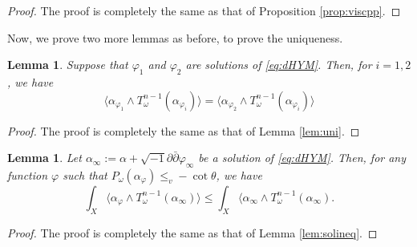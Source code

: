 \documentclass{amsart}
\numberwithin{equation}{section}
\theoremstyle{plain}
\newtheorem{lem}[equation]{Lemma}
\theoremstyle{definition}
\theoremstyle{remark}
\newcommand{\delb}{\sqrt{-1}\partial\bar{\partial}}
\begin{document}
\begin{proof}
    The proof is completely the same as that of Proposition \ref{prop:viscpp}.
\end{proof}

Now, we prove two more lemmas as before, to prove the uniqueness.

\begin{lem}
    Suppose that $\varphi_1$ and $\varphi_2$ are solutions of \eqref{eq:dHYM}. Then, for $i=1,2$, we have 
    $$\big\langle\alpha_{\varphi_1}\wedge T^{n-1}_\omega(\alpha_{\varphi_i})\big\rangle=\big\langle\alpha_{\varphi_2}\wedge T^{n-1}_\omega(\alpha_{\varphi_i})\big\rangle$$
\end{lem}

\begin{proof}
    The proof is completely the same as that of Lemma \ref{lem:uni}.
\end{proof}

\begin{lem}
    Let $\alpha_\infty:=\alpha+\delb\varphi_\infty$ be a solution of \eqref{eq:dHYM}. Then, for any function $\varphi$ such that $P_\omega(\alpha_\varphi)\le_v-\cot\theta$, we have
    $$\int_X\big\langle\alpha_\varphi\wedge T^{n-1}_\omega(\alpha_\infty)\big\rangle\le\int_X\big\langle\alpha_\infty\wedge T^{n-1}_\omega(\alpha_\infty
    ).$$
\end{lem}

\begin{proof}
    The proof is completely the same as that of Lemma \ref{lem:solineq}.
\end{proof}
\end{document}
